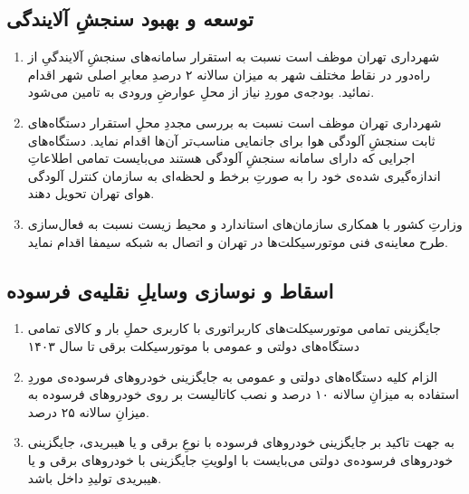 \documentclass[12pt]{atu}
\begin{document}
\subsection{توسعه و بهبود سنجشِ آلایندگی}
\begin{enumerate}
\item 
شهرداری تهران موظف است نسبت به استقرار سامانه‌های سنجشِ آلایندگیِ از راه‌دور در نقاط مختلف شهر به میزان سالانه ۲ درصدِ معابرِ اصلی شهر اقدام نمائید. بودجه‌ی موردِ نیاز از محلِ عوارضِ ورودی به
 تامین می‌شود.
 \item
 شهرداری تهران موظف است نسبت به بررسی مجددِ محلِ استقرار دستگاه‌های ثابت سنجشِ آلودگی هوا برای جانمایی مناسب‌تر آن‌ها اقدام نماید. دستگاه‌های اجرایی که دارای سامانه سنجشِ آلودگی هستند می‌بایست تمامی اطلاعاتِ اندازه‌گیری شده‌ی خود را به صورتِ برخط و لحظه‌ای به سازمان کنترل آلودگی هوای تهران تحویل دهند.
  \item 
 وزارتِ کشور با همکاری سازمان‌های استاندارد و محیط زیست نسبت به فعال‌سازی طرح معاینه‌ی فنی موتورسیکلت‌ها در تهران و اتصال به شبکه سیمفا اقدام نماید.
 \end{enumerate}

\subsection{اسقاط و نوسازی وسایلِ نقلیه‌ی فرسوده}
\begin{enumerate}
	\item 
	جایگزینی تمامی موتورسیکلت‌های کاربراتوری با کاربری حملِ بار و کالای تمامی دستگاه‌های دولتی و عمومی با موتورسیکلت برقی تا سال ۱۴۰۳
	\item 
	الزام کلیه دستگاه‌های دولتی و عمومی به جایگزینی خودروهای فرسوده‌ی موردِ استفاده به میزانِ سالانه ۱۰ درصد و نصب کاتالیست بر روی خودروهای فرسوده به میزانِ سالانه ۲۵ درصد.
	\item 
	به جهت تاکید بر جایگزینی خودروهای فرسوده با نوعِ برقی و یا هیبریدی، جایگزینی خودروهای فرسوده‌ی دولتی می‌بایست با اولویتِ جایگزینی با خودروهای برقی و یا هیبریدی تولیدِ داخل باشد.
\end{enumerate}




\end{document}
